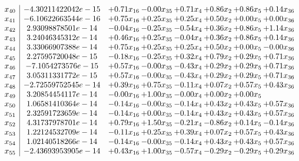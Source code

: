 \documentclass[8pt]{article}
\begin{document}
\[\begin{array}{c| c c@{\hskip 2pt} c@{\hskip 2pt} c@{\hskip 2pt} c@{\hskip 2pt} c@{\hskip 2pt} c@{\hskip 2pt} }
 x_{40}   &  -4.30211422042e-15 & +  0.71 x_{16} & -0.00 x_{35} & +  0.71 x_{4} & +  0.86 x_{2} & +  0.86 x_{5} & +  0.14 x_{36}\\
 x_{41}   &  -6.10622663544e-16 & +  0.75 x_{16} & +  0.25 x_{35} & +  0.25 x_{4} & +  0.50 x_{2} & +  0.00 x_{5} & +  0.00 x_{36}\\
 x_{42}   &  2.93098878501e-14 & -0.04 x_{16} & -0.25 x_{35} & -0.54 x_{4} & +  0.36 x_{2} & +  0.86 x_{5} & +  1.14 x_{36}\\
 x_{43}   &  3.24046345312e-14 & +  0.46 x_{16} & +  0.25 x_{35} & -0.04 x_{4} & +  0.36 x_{2} & +  0.86 x_{5} & +  0.14 x_{36}\\
 x_{44}   &  3.33066907388e-14 & +  0.75 x_{16} & +  0.25 x_{35} & +  0.25 x_{4} & +  0.50 x_{2} & +  0.00 x_{5} & -0.00 x_{36}\\
 x_{45}   &  2.27595720048e-15 & -0.18 x_{16} & -0.25 x_{35} & +  0.32 x_{4} & +  0.79 x_{2} & +  0.29 x_{5} & +  0.71 x_{36}\\
 x_{46}   &  -7.1054273576e-15 & +  0.57 x_{16} & -0.00 x_{35} & -0.43 x_{4} & +  0.29 x_{2} & +  0.29 x_{5} & +  0.71 x_{36}\\
 x_{47}   &  3.05311331772e-15 & +  0.57 x_{16} & -0.00 x_{35} & -0.43 x_{4} & +  0.29 x_{2} & +  0.29 x_{5} & +  0.71 x_{36}\\
 x_{48}   &  -2.72559752545e-14 & +  0.39 x_{16} & +  0.75 x_{35} & -0.11 x_{4} & +  0.07 x_{2} & +  0.57 x_{5} & +  0.43 x_{36}\\
 x_{49}   &  3.20854454117e-14 & -0.00 x_{16} & +  1.00 x_{35} & -0.00 x_{4} & +  0.00 x_{2} & +  0.00 x_{5} &   \\
 x_{50}   &  1.06581410364e-14 & -0.14 x_{16} & -0.00 x_{35} & -0.14 x_{4} & +  0.43 x_{2} & +  0.43 x_{5} & +  0.57 x_{36}\\
 x_{51}   &  2.32591723659e-14 & -0.14 x_{16} & +  0.00 x_{35} & -0.14 x_{4} & +  0.43 x_{2} & +  0.43 x_{5} & +  0.57 x_{36}\\
 x_{52}   &  4.31737978701e-14 & +  0.79 x_{16} & +  1.50 x_{35} & -0.21 x_{4} & -0.86 x_{2} & +  0.14 x_{5} & -0.14 x_{36}\\
 x_{53}   &  1.22124532709e-14 & -0.11 x_{16} & +  0.25 x_{35} & +  0.39 x_{4} & +  0.07 x_{2} & +  0.57 x_{5} & +  0.43 x_{36}\\
 x_{54}   &  1.02140518266e-14 & -0.14 x_{16} & -0.00 x_{35} & -0.14 x_{4} & +  0.43 x_{2} & +  0.43 x_{5} & +  0.57 x_{36}\\
 x_{55}   &  -2.43693953905e-14 & +  0.43 x_{16} & +  1.00 x_{35} & -0.57 x_{4} & -0.29 x_{2} & -0.29 x_{5} & +  0.29 x_{36}\\

\end{array}\]
\end{document}
